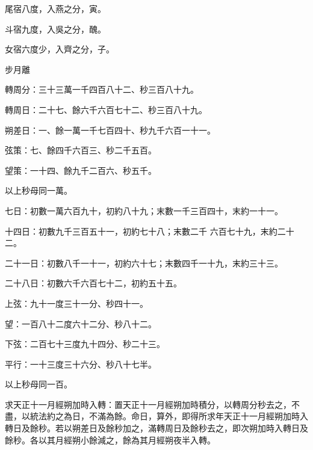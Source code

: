 \begin{pinyinscope}
 尾宿八度，入燕之分，寅。



 斗宿九度，入吳之分，醜。



 女宿六度少，入齊之分，子。



 步月離



 轉周分：三十三萬一千四百八十二、秒三百八十九。



 轉周日：二十七、餘六千六百七十二、秒三百八十九。



 朔差日：一、餘一萬一千七百四十、秒九千六百一十一。



 弦策：七、餘四千六百三、秒二千五百。



 望策：一十四、餘九千二百六、秒五千。



 以上秒母同一萬。



 七日：初數一萬六百九十，初約八十九；末數一千三百四十，末約一十一。



 十四日：初數九千三百五十一，初約七十八；末數二千
 六百七十九，末約二十二。



 二十一日：初數八千一十一，初約六十七；末數四千一十九，末約三十三。



 二十八日：初數六千六百七十二，初約五十五。



 上弦：九十一度三十一分、秒四十一。



 望：一百八十二度六十二分、秒八十二。



 下弦：二百七十三度九十四分、秒二十三。



 平行：一十三度三十六分、秒八十七半。



 以上秒母同一百。



 求天正十一月經朔加時入轉：置天正十一月經朔加時積分，以轉周分秒去之，不盡，以統法約之為日，不滿為餘。命日，算外，即得所求年天正十一月經朔加時入轉日及餘秒。若以朔差日及餘秒加之，滿轉周日及餘秒去之，即次朔加時入轉日及餘秒。各以其月經朔小餘減之，餘為其月經朔夜半入轉。




\end{pinyinscope}
